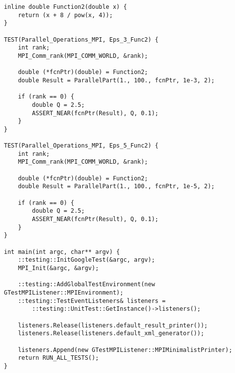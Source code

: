 \documentclass{report}
\begin{document}
\begin{lstlisting}
inline double Function2(double x) {
    return (x + 8 / pow(x, 4));
}

TEST(Parallel_Operations_MPI, Eps_3_Func2) {
    int rank;
    MPI_Comm_rank(MPI_COMM_WORLD, &rank);

    double (*fcnPtr)(double) = Function2;
    double Result = ParallelPart(1., 100., fcnPtr, 1e-3, 2);

    if (rank == 0) {
        double Q = 2.5;
        ASSERT_NEAR(fcnPtr(Result), Q, 0.1);
    }
}

TEST(Parallel_Operations_MPI, Eps_5_Func2) {
    int rank;
    MPI_Comm_rank(MPI_COMM_WORLD, &rank);

    double (*fcnPtr)(double) = Function2;
    double Result = ParallelPart(1., 100., fcnPtr, 1e-5, 2);

    if (rank == 0) {
        double Q = 2.5;
        ASSERT_NEAR(fcnPtr(Result), Q, 0.1);
    }
}

int main(int argc, char** argv) {
    ::testing::InitGoogleTest(&argc, argv);
    MPI_Init(&argc, &argv);

    ::testing::AddGlobalTestEnvironment(new GTestMPIListener::MPIEnvironment);
    ::testing::TestEventListeners& listeners =
        ::testing::UnitTest::GetInstance()->listeners();

    listeners.Release(listeners.default_result_printer());
    listeners.Release(listeners.default_xml_generator());

    listeners.Append(new GTestMPIListener::MPIMinimalistPrinter);
    return RUN_ALL_TESTS();
}
\end{lstlisting}
\end{document}
